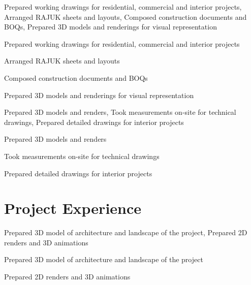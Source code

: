 \betweenProjectsVSpace
{}
\betweensummaryPointsVSpace
Prepared working drawings for residential, commercial and interior projects, Arranged RAJUK sheets and layouts, Composed construction documents and BOQs, Prepared 3D models and renderings for visual representation
\vspace{10pt}
\begin{tightemize}
\item Prepared working drawings for residential, commercial and interior projects
\item Arranged RAJUK sheets and layouts
\item Composed construction documents and BOQs
\item Prepared 3D models and renderings for visual representation
\end{tightemize}
\sectionsep

\betweenProjectsVSpace
{}
\betweensummaryPointsVSpace
Prepared 3D models and renders, Took measurements on-site for technical drawings, Prepared detailed drawings for interior projects
\vspace{10pt}
\begin{tightemize}
\item Prepared 3D models and renders
\item Took measurements on-site for technical drawings
\item Prepared detailed drawings for interior projects
\end{tightemize}
\sectionsep


\betweenProjectsVSpace
\section{Project Experience}
\betweensummaryPointsVSpace
Prepared 3D model of architecture and landscape of the project, Prepared 2D renders and 3D animations
\vspace{10pt}
\begin{tightemize}
\item Prepared 3D model of architecture and landscape of the project
\item Prepared 2D renders and 3D animations
\end{tightemize}
\sectionsep